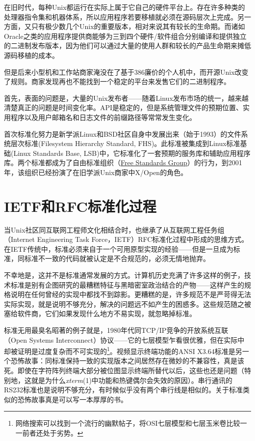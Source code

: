 \documentclass[12pt,oneside]{ctexbook}
\begin{document}
\begin{common-format}
在旧时代，每种Unix都运行在实际上属于它自己的硬件平台上。存在许多种类的处理器指令集和机器体系，所以应用程序若要移植就必须在源码层次上完成。另一方面，又只有极少数几个Unix的重要版本，相对来说其有较长的生命期。而诸如Oracle之类的应用程序提供商能够为三到四个硬件/软件组合分别编译和提供独立的二进制发布版本，因为他们可以通过大量的使用人群和较长的产品生命期来摊低源码移植的成本。

但是后来小型机和工作站商家淹没在了基于386廉价的个人机中，而开源Unix改变了规则。商家发现再也不能找到一个稳定的平台来发售它们的二进制程序。

首先，表面的问题是，大量的Unix发布者——随着Linux发布市场的统一，越来越清楚真正的问题是时间变化率。API是稳定的，但是系统管理文件的预期位置、实用程序以及用户邮箱名和日志文件的前缀路径等常常发生变化。

首次标准化努力是新学派Linux和BSD社区自身中发展出来（始于1993）的文件系统层次标准(Filesystem Hierarchy Standard, FHS)。此标准被集成到Linux标准基础(Linux Standards Base, LSB)中，它标准化了一套预期的服务库和辅助应用程序库。两个标准都成为了自由标准组织（\href{http://www.freestandards.org/}{Free Standards Group}）的行为，到2001年，该组织已经扮演了在旧学派Unix商家中X/Open的角色。

\section{IETF和RFC标准化过程}
当Unix社区同互联网工程师文化相结合时，也继承了从互联网工程任务组（Internet Engineering Task Force，IETF）RFC标准化过程中形成的思维方式。在IETF传统中，标准必须来自于一个可用原型实现的经验——但是一旦成为标准，同标准不一致的代码就被认定是不合规范的，必须无情地抛弃。

不幸地是，这并不是标准通常发展的方式。计算机历史充满了许多这样的例子，技术标准是别有企图研究的最糟糕特征与黑暗密室政治结合的产物——这样产生的规格说明在任何曾经的实现中都找不到踪影。更糟糕的是，许多规范不是严苛得无法实际实现，就是说明不够充分，解决的问题远不如产生的困惑多。这些规范随之被塞给软件商，它们如果发现什么地方不易实现，就忽略掉标准。

标准无用最臭名昭著的例子就是，1980年代同TCP/IP竞争的开放系统互联（Open Systems  Interconnect）协议——它的七层模型乍看很优雅，但在实际中却被证明是过度复杂而不可实现的\footnote{网络搜索可以找到一个流行的幽默帖子，将OSI七层模型和七层玉米卷比较一一前者还处于劣势。}。视频显示终端功能的ANSI X3.64标准是另一个恐怖故事：同标准保持一致的实现版本之间居然存在微妙的不兼容性，真是该死。即使在字符阵列终端大部分被位图显示终端所替代以后，这些也还是问题（特别地，这就是为什么\textit{xterm}(1)中功能和热键偶尔会失效的原因）。串行通讯的RS232标准也是说明不够充分，有时候似乎没有两个串行线是相似的。关于标准类似的恐怖故事真是可以写一本厚厚的书。


\end{common-format}
\end{document}
